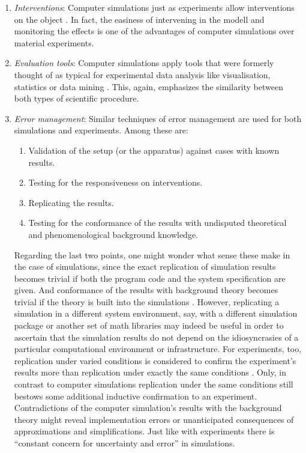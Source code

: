 \documentclass[onecollarge]{STJour}
\numberwithin{equation}{section}
\begin{document}
\begin{enumerate}
\item {\em Interventions}: Computer simulations just as experiments allow interventions on the object \citep[p. 487]{parker:2009} \citep[p. 223]{morgan:2003}. In fact, the easiness of intervening in the modell and monitoring the effects is one of the advantages of computer simulations over material experiments.
  
\item {\em Evaluation tools}: Computer simulations apply tools that were formerly thought of as typical for experimental data analysis like visualisation, statistics or data mining \citep[p. 33]{winsberg:2010}. This, again, emphasizes the similarity between both types of scientific procedure.
  
\item {\em Error management}: Similar techniques of error management are used for both simulations and experiments. Among these are: 
\begin{enumerate}
\item Validation of the setup (or the apparatus) against cases with known results. 
\item Testing for the responsiveness on interventions.
\item Replicating the results.
\item Testing for the conformance of the results with undisputed theoretical and phenomenological background knowledge.
\end{enumerate}
Regarding the last two points, one might wonder what sense these make in the case of simulations, since the exact replication of simulation results becomes trivial if both the program code and the system specification are given. And conformance of the results with background theory becomes trivial if the theory is built into the simulations \citep[p. 44]{winsberg:2010}. However, replicating a simulation in a different system environment, say, with a different simulation package or another set of math libraries may indeed be useful in order to ascertain that the simulation results do not depend on the idiosyncrasies of a particular computational environment or infrastructure. For experiments, too, replication under varied conditions is considered to confirm the experiment's results more than replication under exactly the same conditions \citep{franklin-howson:1984}. Only, in contrast to computer simulations replication under the same conditions still bestows some additional inductive confirmation to an experiment. Contradictions of the computer simulation's results with the background theory might reveal implementation errors or unanticipated consequences of approximations and simplifications. Just like with experiments there is ``constant concern for uncertainty and error'' \citep[p. 34]{winsberg:2010} in simulations.
  

\end{enumerate}
\end{document}

